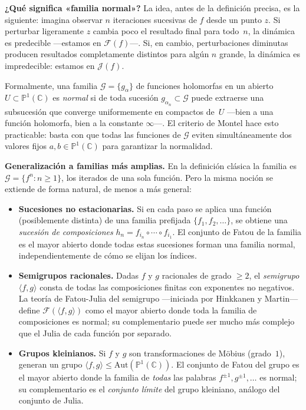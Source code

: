 \documentclass[11pt,a4paper]{article}
\theoremstyle{plain}
\theoremstyle{definition}
\theoremstyle{remark}
\newcommand{\Puno}{\mathbb{P}^1(\mathbb{C})}
\begin{document}
\medskip
\noindent\textbf{¿Qué significa «familia normal»?}
La idea, antes de la definición precisa, es la siguiente: imagina
observar $n$ iteraciones sucesivas de $f$ desde un punto $z$.
Si perturbar ligeramente $z$ cambia poco el resultado final para todo~$n$,
la dinámica es predecible —estamos en $\mathcal{F}(f)$—.
Si, en cambio, perturbaciones diminutas producen resultados completamente
distintos para algún $n$ grande, la dinámica es impredecible:
estamos en $\mathcal{J}(f)$.

Formalmente, una familia $\mathcal{G}=\{g_\alpha\}$ de funciones holomorfas
en un abierto $U\subset\Puno$ es \emph{normal} si de toda sucesión
$g_{\alpha_n}\subset\mathcal{G}$ puede extraerse una subsucesión que
converge uniformemente en compactos de~$U$ —bien a una función holomorfa,
bien a la constante $\infty$—.
El criterio de Montel hace esto practicable: basta con que todas las
funciones de $\mathcal{G}$ eviten simultáneamente dos valores fijos
$a,b\in\Puno$ para garantizar la normalidad.

\medskip
\noindent\textbf{Generalización a familias más amplias.}
En la definición clásica la familia es $\mathcal{G}=\{f^n:n\geq 1\}$,
los iterados de una sola función.
Pero la misma noción se extiende de forma natural, de menos a más general:

\begin{itemize}
  \item \textbf{Sucesiones no estacionarias.}
        Si en cada paso se aplica una función (posiblemente distinta) de
        una familia prefijada $\{f_1,f_2,\ldots\}$, se obtiene una
        \emph{sucesión de composiciones}
        $h_n = f_{i_n}\circ\cdots\circ f_{i_1}$.
        El conjunto de Fatou de la familia es el mayor abierto donde
        todas estas sucesiones forman una familia normal,
        independientemente de cómo se elijan los índices.
  \item \textbf{Semigrupos racionales.}
        Dadas $f$ y $g$ racionales de grado $\geq 2$, el
        \emph{semigrupo} $\langle f,g\rangle$ consta de todas las
        composiciones finitas con exponentes no negativos.
        La teoría de Fatou-Julia del semigrupo —iniciada por
        Hinkkanen y Martin— define $\mathcal{F}(\langle f,g\rangle)$
        como el mayor abierto donde toda la familia de composiciones
        es normal; su complementario puede ser mucho más complejo
        que el Julia de cada función por separado.
  \item \textbf{Grupos kleinianos.}
        Si $f$ y $g$ son transformaciones de Möbius (grado~$1$),
        generan un grupo $\langle f,g\rangle\leq\mathrm{Aut}(\Puno)$.
        El conjunto de Fatou del grupo es el mayor abierto donde la
        familia de \emph{todas} las palabras $f^{\pm 1},g^{\pm 1},\ldots$
        es normal; su complementario es el \emph{conjunto límite}
        del grupo kleiniano, análogo del conjunto de Julia.
\end{itemize}
\end{document}

